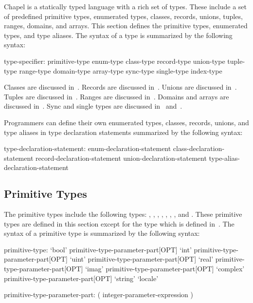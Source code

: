 \label{Types}

Chapel is a statically typed language with a rich set of types.  These
include a set of predefined primitive types, enumerated types,
classes, records, unions, tuples, ranges, domains, and arrays.
This section defines the primitive types, enumerated types, and type
aliases.  The syntax of a type is summarized by the following syntax:
\begin{syntax}
type-specifier:
  primitive-type
  enum-type
  class-type
  record-type
  union-type
  tuple-type
  range-type
  domain-type
  array-type
  sync-type
  single-type
  index-type
\end{syntax}

Classes are discussed in~.  Records are discussed
in~.  Unions are discussed in~.  Tuples are
discussed in~.  Ranges are discussed in~.
Domains and arrays are discussed in~.  Sync
and single types are discussed in~
and~.

Programmers can define their own enumerated types, classes, records,
unions, and type aliases in type declaration statements summarized by
the following syntax:
\begin{syntax}
type-declaration-statement:
  enum-declaration-statement
  class-declaration-statement
  record-declaration-statement
  union-declaration-statement
  type-alias-declaration-statement
\end{syntax}

\subsection{Primitive Types}
\label{Primitive_Types}

The primitive types include the following types: ,
, , , , ,
, and .  These primitive types are defined
in this section except for the  type which is defined
in~.  The syntax of a primitive type is
summarized by the following syntax:
\begin{syntax}
primitive-type:
  `bool' primitive-type-parameter-part[OPT]
  `int' primitive-type-parameter-part[OPT]
  `uint' primitive-type-parameter-part[OPT]
  `real' primitive-type-parameter-part[OPT]
  `imag' primitive-type-parameter-part[OPT]
  `complex' primitive-type-parameter-part[OPT]
  `string'
  `locale'

primitive-type-parameter-part:
  ( integer-parameter-expression )
\end{syntax}

